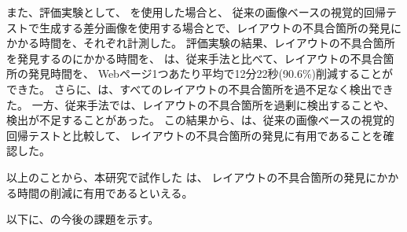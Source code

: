 また、評価実験として、
\toolName を使用した場合と、
従来の画像ベースの視覚的回帰テストで生成する差分画像を使用する場合とで、レイアウトの不具合箇所の発見にかかる時間を、それぞれ計測した。
評価実験の結果、レイアウトの不具合箇所を発見するのにかかる時間を、
\toolName は、従来手法と比べて、レイアウトの不具合箇所の発見時間を、
Webページ1つあたり平均で12分22秒(90.6\%)削減することができた。
さらに、\toolName は、すべてのレイアウトの不具合箇所を過不足なく検出できた。
一方、従来手法では、レイアウトの不具合箇所を過剰に検出することや、検出が不足することがあった。
この結果から、\toolName は、従来の画像ベースの視覚的回帰テストと比較して、
レイアウトの不具合箇所の発見に有用であることを確認した。
\par
以上のことから、本研究で試作した \toolName は、
レイアウトの不具合箇所の発見にかかる時間の削減に有用であるといえる。
\par
以下に、\toolName の今後の課題を示す。
